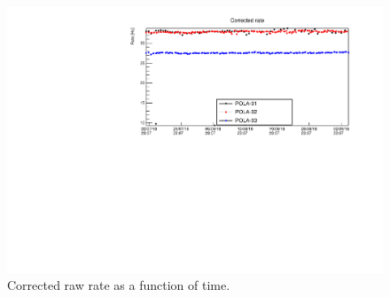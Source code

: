 \documentclass[12pt,a4paper]{amsart}
\begin{document}
\begin{figure}
\centering
\includegraphics[width = \textwidth]{../data/plots/CorrectedRate_all.pdf}
\caption{Corrected raw rate as a function of time.}
\label{fig:CorrectedRate}
\end{figure}


\printbibliography
\end{document}

